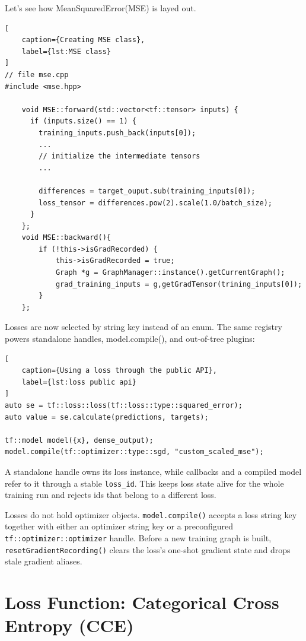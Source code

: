Let's see how MeanSquaredError(MSE) is layed out.

\begin{lstlisting}[
    caption={Creating MSE class},
    label={lst:MSE class}
]
// file mse.cpp
#include <mse.hpp>

    void MSE::forward(std::vector<tf::tensor> inputs) {
      if (inputs.size() == 1) {
        training_inputs.push_back(inputs[0]);
        ...
        // initialize the intermediate tensors
        ...

        differences = target_ouput.sub(training_inputs[0]);
        loss_tensor = differences.pow(2).scale(1.0/batch_size);
      }
    };
    void MSE::backward(){
        if (!this->isGradRecorded) {
            this->isGradRecorded = true;
            Graph *g = GraphManager::instance().getCurrentGraph();
            grad_training_inputs = g,getGradTensor(trining_inputs[0]);
        }
    };
\end{lstlisting}

Losses are now selected by string key instead of an enum. The same
registry powers standalone handles, model.compile(), and out-of-tree
plugins:

\begin{lstlisting}[
    caption={Using a loss through the public API},
    label={lst:loss public api}
]
auto se = tf::loss::loss(tf::loss::type::squared_error);
auto value = se.calculate(predictions, targets);

tf::model model({x}, dense_output);
model.compile(tf::optimizer::type::sgd, "custom_scaled_mse");
\end{lstlisting}

A standalone handle owns its loss instance, while callbacks and a compiled
model refer to it through a stable \texttt{loss\_id}. This keeps loss state
alive for the whole training run and rejects ids that belong to a different
loss.

Losses do not hold optimizer objects. \texttt{model.compile()} accepts a loss
string key together with either an optimizer string key or a preconfigured
\texttt{tf::optimizer::optimizer} handle. Before a new training graph is built,
\texttt{resetGradientRecording()} clears the loss's one-shot gradient state and
drops stale gradient aliases.

\section{Loss Function: Categorical Cross Entropy (CCE)}

